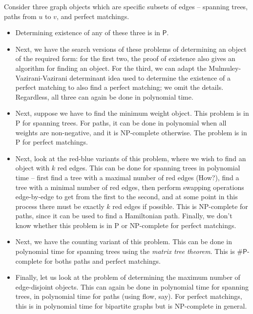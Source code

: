 

Consider three graph objects which are specific subsets of edges -- spanning trees, paths from $u$ to $v$, and perfect matchings. 

\begin{itemize}
	\item Determining existence of any of these three is in $\mathsf{P}$.
	\item Next, we have the search versions of these problems of determining an object of the required form: for the first two, the proof of existence also gives an algorithm for finding an object. For the third, we can adapt the Mulmuley-Vazirani-Vazirani determinant idea used to determine the existence of a perfect matching to also find a perfect matching; we omit the details. Regardless, all three can again be done in polynomial time. \\
	\item Next, suppose we have to find the minimum weight object. This problem is in \textsf{P} for spanning trees. For paths, it can be done in polynomial when all weights are non-negative, and it is \textsf{NP}-complete otherwise. The problem is in \textsf{P} for perfect matchings.
	\item Next, look at the red-blue variants of this problem, where we wish to find an object with $k$ red edges. This can be done for spanning trees in polynomial time -- first find a tree with a maximal number of red edges (How?), find a tree with a minimal number of red edges, then perform swapping operations edge-by-edge to get from the first to the second, and at some point in this process there must be exactly $k$ red edges if possible. This is \textsf{NP}-complete for paths, since it can be used to find a Hamiltonian path. Finally, we don't know whether this problem is in \textsf{P} or \textsf{NP}-complete for perfect matchings.
	\item Next, we have the counting variant of this problem. This can be done in polynomial time for spanning trees using the \emph{matrix tree theorem}. This is $\#\mathsf{P}$-complete for boths paths and perfect matchings.
	\item Finally, let us look at the problem of determining the maximum number of edge-disjoint objects. This can again be done in polynomial time for spanning trees, in polynomial time for paths (using flow, say). For perfect matchings, this is in polynomial time for bipartite graphs but is \textsf{NP}-complete in general.
\end{itemize}

